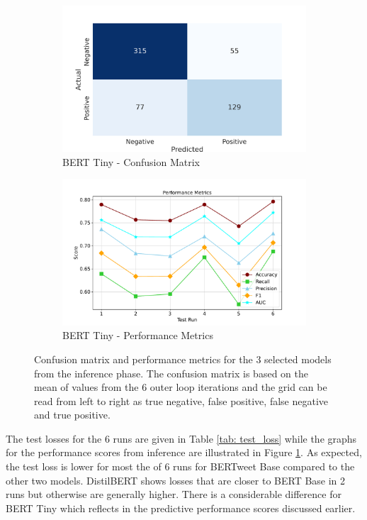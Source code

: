 \begin{figure}[!ht]
    \begin{subfigure}{0.45\linewidth}
        \includegraphics[width=\linewidth]{figures/confusion_berttiny.png}
        \caption{BERT Tiny - Confusion Matrix}
    \end{subfigure}
    \hfil
    \begin{subfigure}{0.45\linewidth}
        \includegraphics[width=\linewidth]{figures/metrics_line_berrttiny.pdf}
        \caption{BERT Tiny - Performance Metrics}
    \end{subfigure}
    \caption{Confusion matrix and performance metrics for the 3 selected models from the inference phase. The confusion matrix is based on the mean of values from the 6 outer loop iterations and the grid can be read from left to right as true negative, false positive, false negative and true positive.}
    \label{fig: deep_dive_results}
\end{figure}

The test losses for the 6 runs are given in Table \ref{tab: test_loss} while the graphs for the performance scores from inference are illustrated in Figure \ref{fig: deep_dive_results}. As expected, the test loss is lower for most the of 6 runs for BERTweet Base compared to the other two models. DistilBERT shows losses that are closer to BERT Base in 2 runs but otherwise are generally higher. There is a considerable difference for BERT Tiny which reflects in the predictive performance scores discussed earlier.\\

